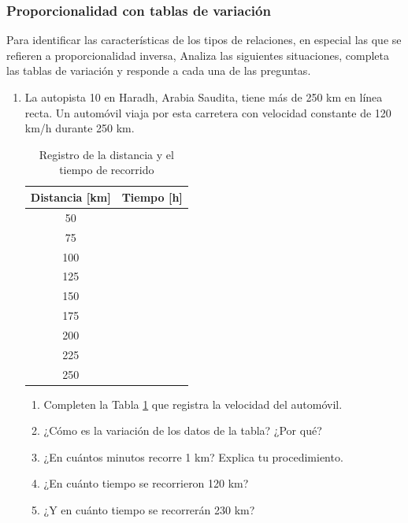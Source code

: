 \documentclass[11pt]{book}
\begin{document}
\subsubsection{Proporcionalidad con tablas de variación}
Para identificar las características de los tipos de relaciones, en
especial las que se refieren a proporcionalidad inversa, Analiza las siguientes situaciones, completa las tablas
de variaci\'on y responde a cada una de las preguntas.
\begin{boxK}
  \begin{enumerate}
    \item La autopista 10 en Haradh, Arabia Saudita, tiene más de 250
          km en línea recta. Un automóvil viaja por esta carretera con
          velocidad constante de 120 km/h durante 250 km.
          \begin{table}[H]
            \centering
            \begin{tabular}{|c|c|}
              \hline
              Distancia [km] & Tiempo [h] \\
              \hline\rowcolor{colorrds!10}
              50             &            \\
              \hline
              75             &            \\
              \hline\rowcolor{colorrds!10}
              100            &            \\
              \hline
              125            &            \\
              \hline\rowcolor{colorrds!10}
              150            &            \\
              \hline
              175            &            \\
              \hline\rowcolor{colorrds!10}
              200            &            \\
              \hline
              225            &            \\
              \hline\rowcolor{colorrds!10}
              250            &            \\
              \hline
            \end{tabular}
            \caption{Registro de la distancia y el tiempo de recorrido}
            \label{tab:arabia}
          \end{table}
          \begin{enumerate}
            \item Completen la Tabla \ref{tab:arabia} que registra la velocidad del automóvil.
            \item ¿Cómo es la variación de los datos de la tabla? ¿Por qué?
            \item ¿En cuántos minutos recorre 1 km? Explica tu procedimiento.
            \item ¿En cuánto tiempo se recorrieron 120 km?
            \item ¿Y en cuánto tiempo se recorrerán 230 km?
          \end{enumerate}


\end{enumerate}
\end{boxK}
\end{document}
